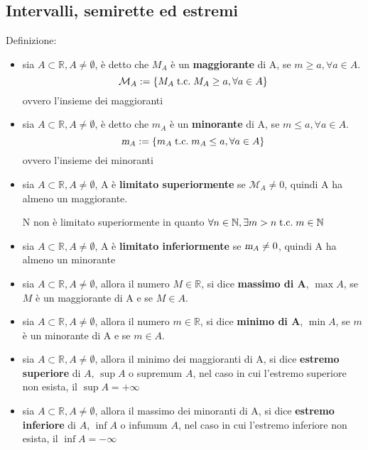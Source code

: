 \documentclass[a4paper,12pt]{article}
\begin{document}
	\subsection{Intervalli, semirette ed estremi}
	Definizione:
	\begin{itemize}
		\item sia $A \subset \mathbb{R}, A \not = \emptyset$, è detto che $M_A$ è un \textbf{maggiorante} di A, se $m \geq a, \forall a \in A$.
		\[\mathcal{M}_A := \{ M_A \;\text{t.c.}\; M_A \geq a, \forall a \in A\}\]
		ovvero l'insieme dei maggioranti
		\item sia $A \subset \mathbb{R}, A \not = \emptyset$, è detto che $m_A$ è un \textbf{minorante} di A, se $m \leq a, \forall a \in A$.
		\[\textsl{m}_A := \{ m_A \;\text{t.c.}\; m_A \leq a, \forall a \in A\}\]
		ovvero l'insieme dei minoranti
		\item sia $A \subset \mathbb{R}, A \not = \emptyset$, A è \textbf{limitato superiormente} se $\mathcal{M}_A \not = 0$, quindi A ha almeno un maggiorante.
		
		N non è limitato superiormente in quanto $\forall n \in \mathbb{N}, \exists m > n \;\text{t.c.}\; m \in \mathbb{N}$
		\item sia $A \subset \mathbb{R}, A \not = \emptyset$, A è \textbf{limitato inferiormente} se $\textsl{m}_A \not = 0$, quindi A ha almeno un minorante
		
		\item sia $A \subset \mathbb{R}, A \not = \emptyset$, allora il numero $M \in \mathbb{R}$, si dice \textbf{massimo di A}, $\max A$, se $M$ è un maggiorante di A e se $M \in A$.
		
		\item sia $A \subset \mathbb{R}, A \not = \emptyset$, allora il numero $m \in \mathbb{R}$, si dice \textbf{minimo di A}, $\min A$, se $m$ è un minorante di A e se $m \in A$.		
		
		\item sia $A \subset \mathbb{R}, A \not = \emptyset$, allora il minimo dei maggioranti di A, si dice \textbf{estremo superiore} di $A$, $\sup A$ o supremum $A$, nel caso in cui l'estremo superiore non esista, il $\sup A = +\infty$
		
		\item sia $A \subset \mathbb{R}, A \not = \emptyset$, allora il massimo dei minoranti di A, si dice \textbf{estremo inferiore} di $A$, $\inf A$ o infumum $A$, nel caso in cui l'estremo inferiore non esista, il $\inf A = -\infty$
	\end{itemize}
	
\end{document}
